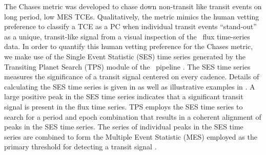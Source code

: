 The Chases metric was developed to chase down non-transit like transit events on long period, low MES TCEs. Qualitatively, the metric mimics the human vetting preference to classify a TCE as a PC when individual transit events ``stand-out'' as a unique, transit-like signal from a visual inspection of the \kepler\ flux time-series data.  In order to quantify this human vetting preference for the Chases metric, we make use of the Single Event Statistic (SES) time series generated by the Transiting Planet Search (TPS) module of the \kepler\ pipeline \citep{JenkinsKDPH}.  The SES time series measures the significance of a transit signal centered on every cadence.  Details of calculating the SES time series is given in \citet{Jenkins2002a} as well as illustrative examples in \citet{Tenenbaum2012}.  A large positive peak in the SES time series indicates that a significant transit signal is present in the flux time series.  TPS employs the SES time series to search for a period and epoch combination that results in a coherent alignment of peaks in the SES time series.  The series of individual peaks in the SES time series are combined to form the Multiple Event Statistic (MES) employed as the primary threshold for detecting a transit signal \citep{Jenkins2002a,Twicken2016,JenkinsKDPH}.  

